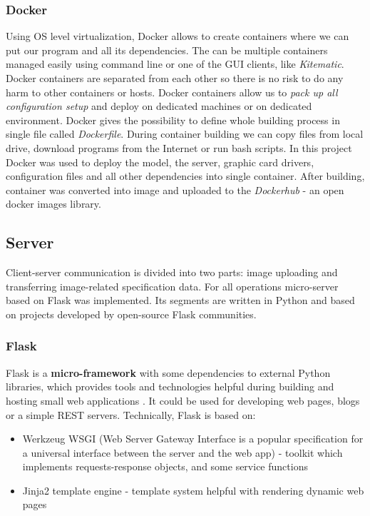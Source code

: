 \documentclass[../Main.tex]{subfiles}
\begin{document}
    \subsubsection{Docker}
    Using OS level virtualization, Docker allows to create containers where we can put our program and all its dependencies. The can be multiple containers managed easily using command line or one of the GUI clients, like \textit{Kitematic}. Docker containers are separated from each other so there is no risk to do any harm to other containers or hosts. Docker containers allow us to \textit{pack up all configuration setup} and deploy on dedicated machines or on dedicated environment. Docker gives the possibility to define whole building process in single file called \textit{Dockerfile}. During container building we can copy files from local drive, download programs from the Internet or run bash scripts. In this project Docker was used to deploy the model, the server, graphic card drivers, configuration files and all other dependencies into single container. After building, container was converted into image and uploaded to the \textit{Dockerhub} - an open docker images library.
    
    
\subsection{Server}
    Client-server communication is divided into two parts: image uploading and transferring image-related specification data. For all operations micro-server based on Flask was implemented. Its segments are written in Python and based on projects developed by open-source Flask communities.

    \subsubsection{Flask}
    Flask is a \textbf{micro-framework} with some dependencies to external Python libraries, which provides tools and technologies helpful during building and hosting small web applications \cite{flaskdocs}. It could be used for developing web pages, blogs or a simple REST servers. Technically, Flask is based on:
    \begin{itemize}
    \item Werkzeug WSGI (Web Server Gateway Interface is a popular specification for a universal interface between the  server and the web app) - toolkit which implements requests-response objects, and some service functions
    \item Jinja2 template engine - template system helpful with rendering dynamic web pages
    \end{itemize}
    
\end{document}
